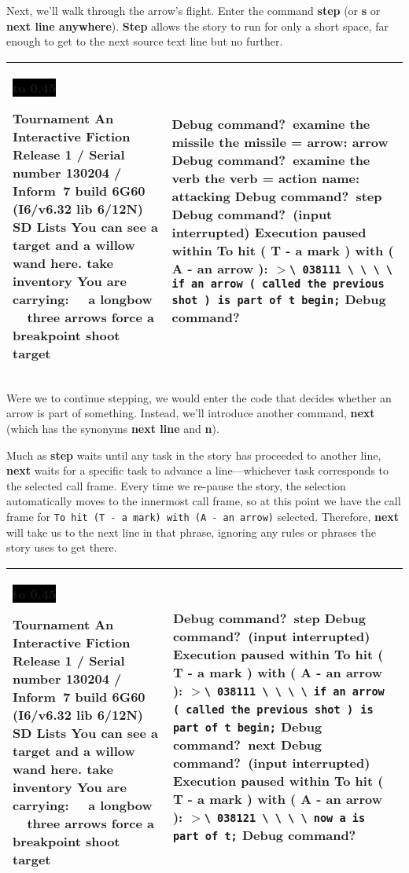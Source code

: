 \documentclass{book}
\newcommand{\n}{\hspace*{\fill}\newline}
\newcommand{\terp}[2]{\begin{center}\begin{tabular}{p{0.45\textwidth}|p{0.45\textwidth}}\midrule #1&#2\\\midrule\end{tabular}\end{center}}
\newcommand{\glkheading}[1]{\textbf{#1}}
\newcommand{\glkinput}[1]{\textbf{#1}}
\newcommand{\glkstatusline}[2]{\centerline{\colorbox{black}{\hbox to 0.45\textwidth{\textcolor{white}{#1\hfil #2}}}}}
\newcommand{\storyprompt}{\raisebox{1.5pt}{\(>\)}}
\newcommand{\cursor}{\raisebox{-1.5pt}{\RectangleThin}}
\newcommand{\markedindent}{\(>\)}
\begin{document}
Next, we'll walk through the arrow's flight.  Enter the command \glkinput{step}
(or \glkinput{s} or \glkinput{next line anywhere}).  \glkinput{Step} allows the
story to run for only a short space, far enough to get to the next source text
line but no further.

\terp{\glkstatusline{Lists}{0/2}\n
  \glkheading{Tournament}\n
  An Interactive Fiction\n
  Release 1 / Serial number 130204 / Inform~7 build 6G60 (I6/v6.32 lib 6/12N) SD\n
  \n
  \glkheading{Lists}\n
  You can see a target and a willow wand here.\n
  \n
  \storyprompt\glkinput{take inventory}\n
  You are carrying:\n
  \null\ \ a longbow\n
  \null\ \ three arrows\n
  \n
  \storyprompt\glkinput{force a breakpoint}\n
  \storyprompt\glkinput{shoot target}}{%
  \n
  Debug command?\ \glkinput{examine the missile}\n
  \n
  the missile = arrow: arrow\n
  \n
  Debug command?\ \glkinput{examine the verb}\n
  \n
  the verb = action name: attacking\n
  \n
  Debug command?\ \glkinput{step}\n
  \n
  Debug command?\ (input interrupted)\n
  \n
  Execution paused within To hit ( T - a mark ) with ( A - an arrow ):\n
  \markedindent \lstinline{\ 038111 \ \ \ \ if an arrow ( called the previous shot )}\ \lstinline{is part of t begin;}\n
  \n
  Debug command?\ \cursor}

Were we to continue stepping, we would enter the code that decides whether an
arrow is part of something.  Instead, we'll introduce another command,
\glkinput{next} (which has the synonyms \glkinput{next line} and \glkinput{n}).

Much as \glkinput{step} waits until any task in the story has proceeded to
another line, \glkinput{next} waits for a specific task to advance a
line---whichever task corresponds to the selected call frame.  Every time we
re-pause the story, the selection automatically moves to the innermost call
frame, so at this point we have the call frame for
\lstinline{To hit (T - a mark)}\lstinline{ with (A - an arrow)} selected.
Therefore, \glkinput{next} will take us to the next line in that phrase,
ignoring any rules or phrases the story uses to get there.

\terp{\glkstatusline{Lists}{0/2}\n
  \glkheading{Tournament}\n
  An Interactive Fiction\n
  Release 1 / Serial number 130204 / Inform~7 build 6G60 (I6/v6.32 lib 6/12N) SD\n
  \n
  \glkheading{Lists}\n
  You can see a target and a willow wand here.\n
  \n
  \storyprompt\glkinput{take inventory}\n
  You are carrying:\n
  \null\ \ a longbow\n
  \null\ \ three arrows\n
  \n
  \storyprompt\glkinput{force a breakpoint}\n
  \storyprompt\glkinput{shoot target}}{%
  \n
  Debug command?\ \glkinput{step}\n
  \n
  Debug command?\ (input interrupted)\n
  \n
  Execution paused within To hit ( T - a mark ) with ( A - an arrow ):\n
  \markedindent \lstinline{\ 038111 \ \ \ \ if an arrow ( called the previous shot )}\ \lstinline{is part of t begin;}\n
  \n
  Debug command?\ \glkinput{next}\n
  \n
  Debug command?\ (input interrupted)\n
  \n
  Execution paused within To hit ( T - a mark ) with ( A - an arrow ):\n
  \markedindent \lstinline{\ 038121 \ \ \ \ now a is part of t;}\n
  \n
  Debug command?\ \cursor}
\end{document}
